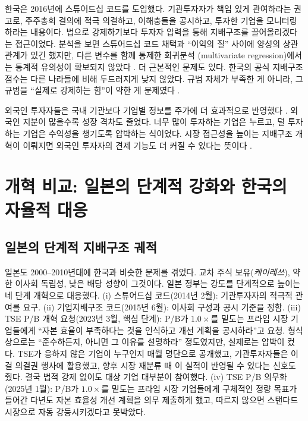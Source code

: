 \documentclass[12pt]{article}
\begin{document}
한국은 2016년에 스튜어드십 코드를 도입했다. 기관투자자가 책임 있게 관여하라는 권고로, 주주총회 결의에 적극 의결하고, 이해충돌을 공시하고, 투자한 기업을 모니터링하라는 내용이다. 법으로 강제하기보다 투자자 압력을 통해 지배구조를 끌어올리겠다는 접근이었다. 분석을 보면 스튜어드십 코드 채택과 ``이익의 질'' 사이에 양성의 상관관계가 있긴 했지만, 다른 변수를 함께 통제한 회귀분석 (multivariate regression)에서는 통계적 유의성이 확보되지 않았다 \citep{park2021stewardship}. 더 근본적인 문제도 있다. 한국의 공식 지배구조 점수는 다른 나라들에 비해 두드러지게 낮지 않았다. 규범 자체가 부족한 게 아니라, 그 규범을 ``실제로 강제하는 힘''이 약한 게 문제였다 \citep{kim2025causes}.

외국인 투자자들은 국내 기관보다 기업별 정보를 주가에 더 효과적으로 반영했다 \citep{kim2015foreign}. 외국인 지분이 많을수록 성장 격차도 줄었다. 너무 많이 투자하는 기업은 누르고, 덜 투자하는 기업은 수익성을 챙기도록 압박하는 식이었다. 시장 접근성을 높이는 지배구조 개혁이 이뤄지면 외국인 투자자의 견제 기능도 더 커질 수 있다는 뜻이다 \citep{joo2026foreign}.

\section{개혁 비교: 일본의 단계적 강화와 한국의 자율적 대응}
\label{sec:reform}

\subsection{일본의 단계적 지배구조 궤적}

일본도 2000--2010년대에 한국과 비슷한 문제를 겪었다. 교차 주식 보유(\textit{케이레쓰}), 약한 이사회 독립성, 낮은 배당 성향이 그것이다. 일본 정부는 강도를 단계적으로 높이는 네 단계 개혁으로 대응했다. (i) 스튜어드십 코드(2014년 2월): 기관투자자의 적극적 관여를 요구. (ii) 기업지배구조 코드(2015년 6월): 이사회 구성과 공시 기준을 정함. (iii) TSE P/B 개혁 요청(2023년 3월, 핵심 단계): P/B가 $1.0\times$를 밑도는 프라임 시장 기업들에게 ``자본 효율이 부족하다는 것을 인식하고 개선 계획을 공시하라''고 요청. 형식상으로는 ``준수하든지, 아니면 그 이유를 설명하라'' 정도였지만, 실제로는 압박이 컸다. TSE가 응하지 않은 기업이 누구인지 매월 명단으로 공개했고, 기관투자자들은 이걸 의결권 행사에 활용했고, 향후 시장 재분류 때 이 실적이 반영될 수 있다는 신호도 줬다. 결국 법적 강제 없이도 대상 기업 대부분이 참여했다. (iv) TSE P/B 의무화(2025년 1월): P/B가 $1.0\times$를 밑도는 프라임 시장 기업들에게 구체적인 정량 목표가 들어간 다년도 자본 효율성 개선 계획을 의무 제출하게 했고, 따르지 않으면 스탠다드 시장으로 자동 강등시키겠다고 못박았다.
\end{document}
